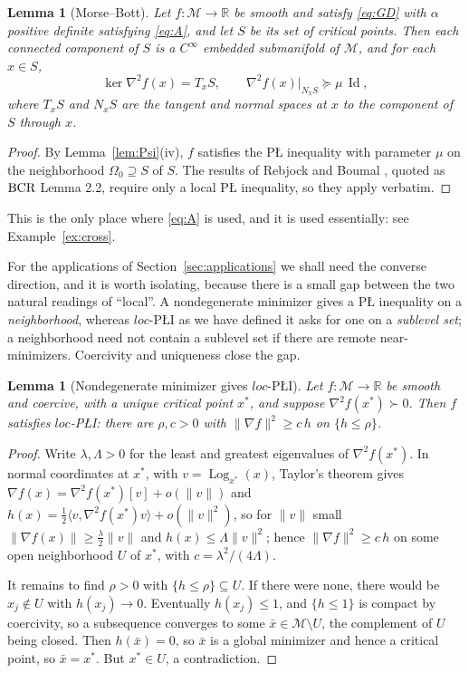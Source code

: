 \documentclass[11pt]{article}
\theoremstyle{plain}
\newtheorem{lem}[thm]{Lemma}
\theoremstyle{definition}
\theoremstyle{remark}
\newcommand{\M}{\mathcal{M}}
\newcommand{\R}{\mathbb{R}}
\DeclareMathOperator{\Id}{Id}
\newcommand{\Log}{\operatorname{Log}}
\newcommand{\bcr}{\textup{BCR}}
\begin{document}
\begin{lem}[Morse--Bott]\label{lem:MB}
Let $f\colon\M\to\R$ be smooth and satisfy \eqref{eq:GD} with $\alpha$ positive
definite satisfying \eqref{eq:A}, and let $S$ be its set of critical points.
Then each connected component of $S$ is a $C^\infty$ embedded submanifold of
$\M$, and for each $x\in S$,
\begin{equation}\label{eq:MB}
  \ker\nabla^2 f(x) = T_xS,
  \qquad
  \nabla^2 f(x)\big|_{N_xS} \succeq \mu\,\Id ,
\end{equation}
where $T_xS$ and $N_xS$ are the tangent and normal spaces at $x$ to the
component of $S$ through $x$.
\end{lem}

\begin{proof}
By Lemma~\ref{lem:Psi}(iv), $f$ satisfies the P\L{} inequality with parameter
$\mu$ on the neighborhood $\Omega_0 \supseteq S$ of $S$. The results of
Rebjock and Boumal \cite[Thm.~2.16, Cor.~2.17]{RB2024a}, quoted as $\bcr$
Lemma 2.2, require only a local P\L{} inequality, so they apply verbatim.
\end{proof}

This is the only place where \eqref{eq:A} is used, and it is used essentially:
see Example~\ref{ex:cross}.

For the applications of Section~\ref{sec:applications} we shall need the
converse direction, and it is worth isolating, because there is a small gap
between the two natural readings of ``local''. A nondegenerate minimizer gives a
P\L{} inequality on a \emph{neighborhood}, whereas $loc$-P\L{}I as we have defined
it asks for one on a \emph{sublevel set}; a neighborhood need not contain a
sublevel set if there are remote near-minimizers. Coercivity and uniqueness close
the gap.

\begin{lem}[Nondegenerate minimizer gives $loc$-P\L{}I]\label{lem:nondeg}
Let $f\colon\M\to\R$ be smooth and coercive, with a unique critical point $x^*$,
and suppose $\nabla^2f(x^*)\succ0$. Then $f$ satisfies $loc$-P\L{}I: there are
$\rho,c>0$ with $\|\nabla f\|^2 \ge c\,h$ on $\{h\le\rho\}$.
\end{lem}

\begin{proof}
Write $\lambda,\Lambda>0$ for the least and greatest eigenvalues of
$\nabla^2f(x^*)$. In normal coordinates at $x^*$, with $v=\Log_{x^*}(x)$, Taylor's
theorem gives $\nabla f(x) = \nabla^2f(x^*)[v]+o(\|v\|)$ and
$h(x) = \tfrac12\langle v,\nabla^2f(x^*)v\rangle+o(\|v\|^2)$, so for $\|v\|$ small
$\|\nabla f(x)\|\ge\tfrac{\lambda}{2}\|v\|$ and $h(x)\le\Lambda\|v\|^2$; hence
$\|\nabla f\|^2 \ge c\,h$ on some open neighborhood $U$ of $x^*$, with
$c=\lambda^2/(4\Lambda)$.

It remains to find $\rho>0$ with $\{h\le\rho\}\subseteq U$. If there were none,
there would be $x_j\notin U$ with $h(x_j)\to0$. Eventually $h(x_j)\le1$, and
$\{h\le1\}$ is compact by coercivity, so a subsequence converges to some
$\bar x\in\M\setminus U$, the complement of $U$ being closed. Then $h(\bar x)=0$,
so $\bar x$ is a global minimizer and hence a critical point, so $\bar x=x^*$. But
$x^*\in U$, a contradiction.
\end{proof}
\end{document}
